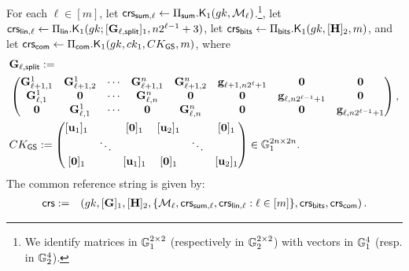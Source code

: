 \begin{description}
For each $\ell\in[m]$, let
\(\mathsf{crs}_{\mathsf{sum},\ell} \gets \Pi_{\mathsf{sum}}.\mathsf{K}_1({gk}, \mathcal{M}_\ell)\).\footnote{We identify
matrices in \(\mathbb{G}_1^{2 \times 2}\) (respectively in \(\mathbb{G}_2^{2 \times 2}\)) with vectors in \(\mathbb{G}_1^{4}\) (resp. in \(\mathbb{G}_2^{4}\)).}, let \(\mathsf{crs}_{\mathsf{lin},\ell}\gets \Pi_\mathsf{lin}.\mathsf{K}_1(gk;\allowbreak[\mathbf{{G}}_{\ell,\mathsf{split}}]_1,n2^{\ell-1}+3)\), let \(\mathsf{crs}_{\mathsf{bits}}\gets\Pi_{\mathsf{bits}}.\mathsf{K}_1(gk,[\mathbf{{H}}]_2,m)\), and let \(\mathsf{crs}_{\mathsf{com}} \gets \Pi_{\mathsf{com}}.\mathsf{K}_1({gk}, ck_1,CK_{\mathsf{GS}},m)\), where
\begin{align*}
&\matr{G}_{\ell,\mathsf{split}}:=\\
&\begin{pmatrix}
\matr{G}^1_{\ell+1,1} & \matr{G}^{1}_{\ell+1,2} & \cdots & \matr{G}^{n}_{\ell+1,1} & \matr{G}^{n}_{\ell+1,2} & \vecb{g}_{\ell+1,n2^\ell+1} & \matr{0}                       & \matr{0}\\
\matr{G}^{1}_{\ell,1}   & \matr{0}              & \cdots & \matr{G}^n_{\ell,n}   & \matr{0}              & \matr{0}                  & \vecb{g}_{\ell,n2^{\ell-1}+1}  & \matr{0}\\
\matr{0}              & \matr{G}^1_{\ell,1}   & \cdots & \matr{0}              & \matr{G}^n_{\ell,n}   & \matr{0}                  & \matr{0}                       & \vecb{g}_{\ell,n2^{\ell-1}+1}
\end{pmatrix},\\
&CK_\GS:=\pmatri{
    [\vecb{u}_1]_1 &        & [\vecb{0}]_1   & [\vecb{u}_2]_1 &        & [\vecb{0}]_1\\
               & \ddots &            &            & \ddots &         \\
    [\vecb{0}]_1   &        & [\vecb{u}_1]_1 & [\vecb{0}]_1   &        & [\vecb{u}_2]_1
}\in\GG_1^{2n\times2n}.
\end{align*}
The common reference string is given by:
\begin{eqnarray*}
\mathsf{crs}&:=&\left( gk, [\mathbf{{G}}]_1,
    [\mathbf{{H}}]_2, \{\mathcal{M}_\ell,\mathsf{crs}_{\mathsf{sum},\ell},\mathsf{crs}_{\mathsf{lin},\ell}:\ell\in [m]\},\mathsf{crs}_{\mathsf{bits}},\mathsf{crs}_{\mathsf{com}} \right).
 \end{eqnarray*}



\end{description}
